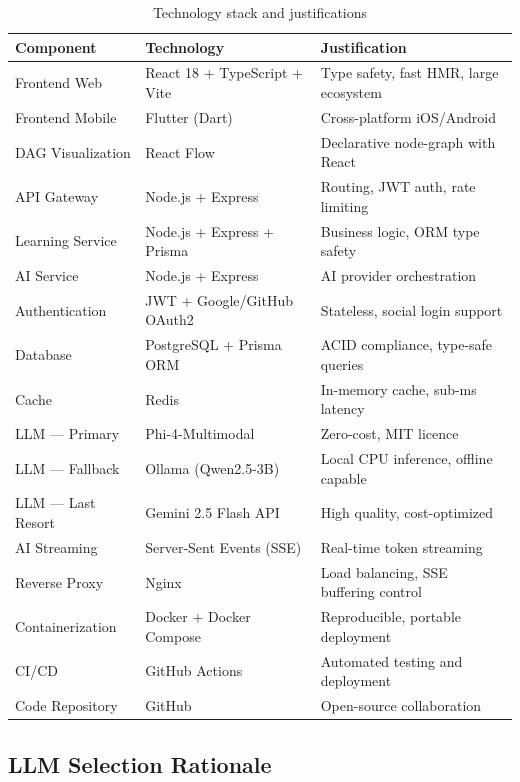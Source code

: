 \begin{table}[htbp]
    \centering
    \caption{Technology stack and justifications}
    \label{tab:ch01_tech_stack}
    \begin{tabular}{lll}
        \toprule
        Component & Technology & Justification \\
        \midrule
        Frontend Web & React 18 + TypeScript + Vite & Type safety, fast HMR, large ecosystem \\
        Frontend Mobile & Flutter (Dart) & Cross-platform iOS/Android \\
        DAG Visualization & React Flow & Declarative node-graph with React \\
        API Gateway & Node.js + Express & Routing, JWT auth, rate limiting \\
        Learning Service & Node.js + Express + Prisma & Business logic, ORM type safety \\
        AI Service & Node.js + Express & AI provider orchestration \\
        Authentication & JWT + Google/GitHub OAuth2 & Stateless, social login support \\
        Database & PostgreSQL + Prisma ORM & ACID compliance, type-safe queries \\
        Cache & Redis & In-memory cache, sub-ms latency \\
        LLM --- Primary & Phi-4-Multimodal & Zero-cost, MIT licence \\
        LLM --- Fallback & Ollama (Qwen2.5-3B) & Local CPU inference, offline capable \\
        LLM --- Last Resort & Gemini 2.5 Flash API & High quality, cost-optimized \\
        AI Streaming & Server-Sent Events (SSE) & Real-time token streaming \\
        Reverse Proxy & Nginx & Load balancing, SSE buffering control \\
        Containerization & Docker + Docker Compose & Reproducible, portable deployment \\
        CI/CD & GitHub Actions & Automated testing and deployment \\
        Code Repository & GitHub & Open-source collaboration \\
        \bottomrule
    \end{tabular}
\end{table}

\subsection{LLM Selection Rationale}

